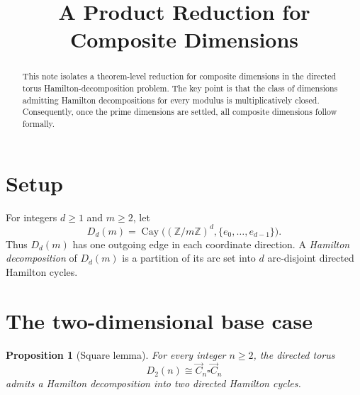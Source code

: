 \documentclass[11pt]{article}
\title{A Product Reduction for Composite Dimensions}
\author{}
\date{}
\newtheorem{proposition}{Proposition}
\newcommand{\torus}[2]{D_{#1}(#2)}
\newcommand{\cycle}[1]{\vec C_{#1}}
\begin{document}
\maketitle

\begin{abstract}
This note isolates a theorem-level reduction for composite dimensions in the
directed torus Hamilton-decomposition problem. The key point is that the class
of dimensions admitting Hamilton decompositions for every modulus is
multiplicatively closed. Consequently, once the prime dimensions are settled,
all composite dimensions follow formally.
\end{abstract}

\section*{Setup}

For integers $d \ge 1$ and $m \ge 2$, let
\[
\torus{d}{m}
=
\operatorname{Cay}\bigl((\mathbb Z/m\mathbb Z)^d,\{e_0,\dots,e_{d-1}\}\bigr).
\]
Thus $\torus{d}{m}$ has one outgoing edge in each coordinate direction. A
\emph{Hamilton decomposition} of $\torus{d}{m}$ is a partition of its arc set
into $d$ arc-disjoint directed Hamilton cycles.

\section*{The two-dimensional base case}

\begin{proposition}[Square lemma]
For every integer $n \ge 2$, the directed torus
\[
\torus{2}{n} \cong \cycle{n} \square \cycle{n}
\]
admits a Hamilton decomposition into two directed Hamilton cycles.
\end{proposition}
\end{document}
